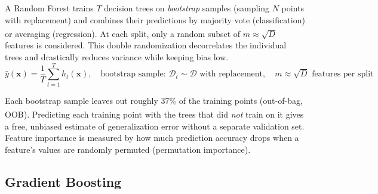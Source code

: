 \begin{tcbitemize}[ skin=sectionraster ]
    \tcbitem[title={Bagging and the Random Forest Algorithm}, raster multicolumn=3]
    A Random Forest trains $T$ decision trees on \emph{bootstrap} samples (sampling $N$ points with replacement) and combines their predictions by majority vote (classification) or averaging (regression)\textsuperscript{\cite[][pp.~586--588]{hanDataMiningConcepts2012}}. At each split, only a random subset of $m \approx \sqrt{D}$ features is considered. This double randomization decorrelates the individual trees and drastically reduces variance while keeping bias low.
    \tcblower
    \begin{equation}
        \hat{y}(\mathbf{x}) = \frac{1}{T} \sum_{t=1}^{T} h_t(\mathbf{x}),
        \quad
        \text{bootstrap sample: } \mathcal{D}_t \sim \mathcal{D} \text{ with replacement},
        \quad
        m \approx \sqrt{D} \text{ features per split}
    \end{equation}

    \tcbitem[title={Out-of-Bag Error and Feature Importance}, raster multicolumn=3]
    Each bootstrap sample leaves out roughly 37\% of the training points (out-of-bag, OOB)\textsuperscript{\cite[][p.588]{hanDataMiningConcepts2012}}. Predicting each training point with the trees that did \emph{not} train on it gives a free, unbiased estimate of generalization error without a separate validation set. Feature importance is measured by how much prediction accuracy drops when a feature's values are randomly permuted (permutation importance).
\end{tcbitemize}

\subsection{Gradient Boosting}

